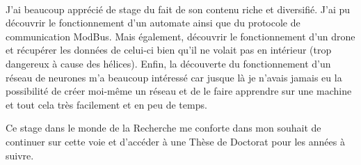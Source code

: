     \paragraph*{}
    J'ai beaucoup apprécié de stage du fait de son contenu riche et diversifié. J'ai pu découvrir le fonctionnement d'un automate ainsi que du protocole de communication ModBus. Mais également, découvrir le fonctionnement d'un drone et récupérer les données de celui-ci bien qu'il ne volait pas en intérieur (trop dangereux à cause des hélices). Enfin, la découverte du fonctionnement d'un réseau de neurones m'a beaucoup intéressé car jusque là je n'avais jamais eu la possibilité de créer moi-même un réseau et de le faire apprendre sur une machine et tout cela très facilement et en peu de temps.
    
    Ce stage dans le monde de la Recherche me conforte dans mon souhait de continuer sur cette voie et d'accéder à une Thèse de Doctorat pour les années à suivre.